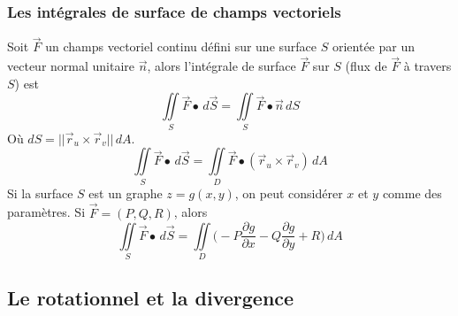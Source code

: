 		\subsubsection{Les intégrales de surface de champs vectoriels}
			\begin{mydef}
				Soit $\vec{F}$ un champs vectoriel continu défini sur une surface $S$ orientée par un vecteur normal unitaire $\vec{n}$, alors l'intégrale de surface $\vec{F}$ sur $S$  (flux de $\vec{F}$ à travers $S$) est 
				\[\iint\limits_S\vec{F}\bullet\, d\vec{S}=\iint\limits_S \vec{F}\bullet \vec{n}\, dS\]
				Où $dS = ||\vec{r}_u\times\vec{r}_v||\, dA$.
				\[\iint\limits_S\vec{F}\bullet\, d\vec{S}=\iint\limits_D \vec{F}\bullet (\vec{r}_u\times\vec{r}_v)\, dA\]
				Si la surface $S$ est un graphe $z=g(x,y)$, on peut considérer $x$ et $y$ comme des paramètres. Si $\vec{F}=(P,Q,R)$, alors
				\[\iint\limits_S\vec{F}\bullet\, d\vec{S}=\iint\limits_D\Bigg(-P\frac{\partial g}{\partial x}-Q\frac{\partial g}{\partial y} + R\Bigg)\, dA\]
			\end{mydef}
	\subsection{Le rotationnel et la divergence}
